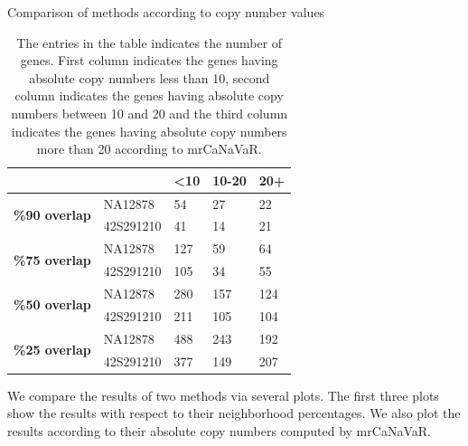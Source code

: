 \begin{table}[!htbp]
\centering
\caption{Comparison of methods according to copy number values}
\begin{tabular}{lllll}
\hline
\multicolumn{2}{l}{}                                                                         & \textbf{\textless{}10} & \textbf{10-20} & \textbf{20+} \\ \hline
\multicolumn{1}{l|}{\multirow{2}{*}{\textbf{\%90 overlap}}} & \multicolumn{1}{l|}{NA12878}   & 54                        & 27              & 22            \\ \cline{2-5} 
\multicolumn{1}{l|}{}                                       & \multicolumn{1}{l|}{42S291210} & 41                        & 14             & 21            \\ \hline
\multicolumn{1}{l|}{\multirow{2}{*}{\textbf{\%75 overlap}}} & \multicolumn{1}{l|}{NA12878}   & 127                       & 59             & 64           \\ \cline{2-5} 
\multicolumn{1}{l|}{}                                       & \multicolumn{1}{l|}{42S291210} & 105                       & 34             & 55            \\ \hline
\multicolumn{1}{l|}{\multirow{2}{*}{\textbf{\%50 overlap}}} & \multicolumn{1}{l|}{NA12878}   & 280                       & 157             & 124           \\ \cline{2-5} 
\multicolumn{1}{l|}{}                                       & \multicolumn{1}{l|}{42S291210} & 211                       & 105             & 104           \\ \hline
\multicolumn{1}{l|}{\multirow{2}{*}{\textbf{\%25 overlap}}} & \multicolumn{1}{l|}{NA12878}   & 488                       & 243            & 192           \\ \cline{2-5} 
\multicolumn{1}{l|}{}                                       & \multicolumn{1}{l|}{42S291210} & 377                       & 149            & 207           \\ \hline
\end{tabular}
\caption*{The entries in the table indicates the number of genes. First column indicates the genes having absolute copy numbers less than 10, second column indicates the genes having absolute copy numbers between 10 and 20 and the third column indicates the genes having absolute copy numbers more than 20 according to mrCaNaVaR.}
\label{overlapVScnvNo}
\end{table}

We compare the results of two methods via several plots. The first three plots show the results with respect to their neighborhood percentages. We also plot the results according to their absolute copy numbers computed by mrCaNaVaR.

